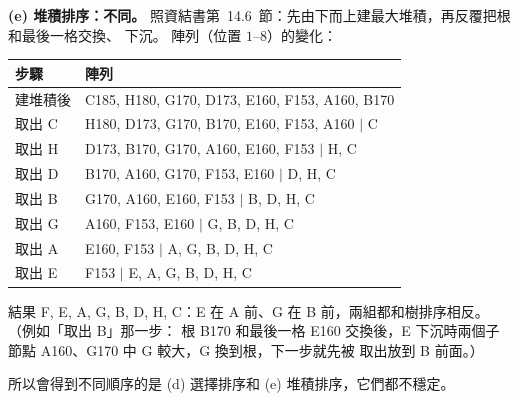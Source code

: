 \begin{pastsoln}
\textbf{(e) 堆積排序：不同。} 照資結書第~14.6~節：先由下而上建最大堆積，再反覆把根和最後一格交換、
下沉。 陣列（位置 $1$--$8$）的變化：
\begin{center}
\small
\begin{tabular}{ll}
\toprule
步驟 & 陣列 \\
\midrule
建堆積後 & C185, H180, G170, D173, E160, F153, A160, B170 \\
取出 C & H180, D173, G170, B170, E160, F153, A160 $\mid$ C \\
取出 H & D173, B170, G170, A160, E160, F153 $\mid$ H, C \\
取出 D & B170, A160, G170, F153, E160 $\mid$ D, H, C \\
取出 B & G170, A160, E160, F153 $\mid$ B, D, H, C \\
取出 G & A160, F153, E160 $\mid$ G, B, D, H, C \\
取出 A & E160, F153 $\mid$ A, G, B, D, H, C \\
取出 E & F153 $\mid$ E, A, G, B, D, H, C \\
\bottomrule
\end{tabular}
\end{center}
結果 F, E, A, G, B, D, H, C：E 在 A 前、G 在 B 前，兩組都和樹排序相反。 （例如「取出 B」那一步：
根 B170 和最後一格 E160 交換後，E 下沉時兩個子節點 A160、G170 中 G 較大，G 換到根，下一步就先被
取出放到 B 前面。）

所以會得到不同順序的是 (d) 選擇排序和 (e) 堆積排序，它們都不穩定。
\end{pastsoln}
